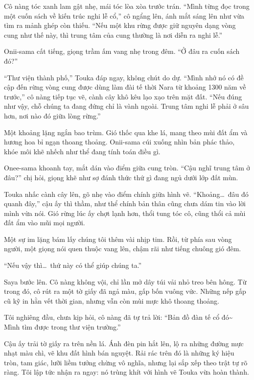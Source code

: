 \documentclass[../main.tex]{subfiles}
\begin{document}
Cô nàng tóc xanh lam gật nhẹ, mái tóc lòa xòa trước trán. ``Mình từng đọc trong một cuốn sách về kiến trúc nghi lễ cổ,'' cô ngẩng lên, ánh mắt sáng lên như vừa tìm ra mảnh ghép còn thiếu. ``Nếu một khu rừng được giữ nguyên dạng vòng cung như thế này, thì trung tâm của cung thường là nơi diễn ra nghi lễ.''

Onii-sama cất tiếng, giọng trầm ấm vang nhẹ trong đêm. ``Ở đâu ra cuốn sách đó?''

``Thư viện thành phố,'' Touka đáp ngay, không chút do dự. ``Mình nhớ nó có đề cập đến rừng vòng cung được dùng làm đài tế thời Nara từ khoảng 1300 năm về trước,'' cô nàng tiếp tục vẽ, cành cây khô kêu lạo xạo trên mặt đất. ``Nếu đúng như vậy, chỗ chúng ta đang đứng chỉ là vành ngoài. Trung tâm nghi lễ phải ở sâu hơn, nơi nào đó giữa lòng rừng.''

Một khoảng lặng ngắn bao trùm. Gió thốc qua khe lá, mang theo mùi đất ẩm và hương hoa bỉ ngạn thoang thoảng. Onii-sama cúi xuống nhìn bản phác thảo, khóe môi khẽ nhếch như thể đang tính toán điều gì.

Onee-sama khoanh tay, mắt dán vào điểm giữa cung tròn. ``Cậu nghĩ trung tâm ở đâu?'' chị hỏi, giọng khẽ như sợ đánh thức thứ gì đang ngủ dưới lớp đất mùn.

Touka nhấc cành cây lên, gõ nhẹ vào điểm chính giữa hình vẽ. ``Khoảng\dots\ đâu đó quanh đây,'' cậu ấy thì thầm, như thể chính bản thân cũng chưa dám tin vào lời mình vừa nói. Gió rừng lúc ấy chợt lạnh hơn, thổi tung tóc cô, cũng thổi cả mùi đất ẩm vào mũi mọi người.

Một sự im lặng bám lấy chúng tôi thêm vài nhịp tim. Rồi, từ phía sau vòng người, một giọng nói quen thuộc vang lên, chậm rãi như tiếng chuông gió đêm.

``Nếu vậy thì\dots\ thứ này có thể giúp chúng ta.''

Saya bước lên. Cô nàng không vội, chỉ lần mở dây túi vải nhỏ treo bên hông. Từ trong đó, cô rút ra một tờ giấy đã ngả màu, gấp bốn vuông vức. Những nếp gấp cũ kỹ in hằn vết thời gian, nhưng vẫn còn mùi mực khô thoang thoảng.

Tôi nghiêng đầu, chưa kịp hỏi, cô nàng đã tự trả lời: ``Bản đồ đàn tế cổ đó\~{} Mình tìm được trong thư viện trường.''

Cậu ấy trải tờ giấy ra trên nền lá. Ánh đèn pin hắt lên, lộ ra những đường mực nhạt màu chì, vẽ khu đất hình bán nguyệt. Rải rác trên đó là những ký hiệu tròn, tam giác, lưỡi liềm tưởng chừng vô nghĩa, nhưng lại sắp xếp theo trật tự rõ ràng. Tôi lập tức nhận ra ngay: nó trùng khít với hình vẽ Touka vừa hoàn thành.
\end{document}
